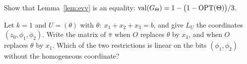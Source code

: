 \chapterquestions
\begin{question}\label{q:evvexact}
Show that Lemma~\ref{lem:evv} is an equality: $\operatorname{val}(G_\Theta)=1-\bigl(1-\operatorname{OPT}(\Theta)\bigr)/3$.
\end{question}

\begin{question}\label{q:pibar}
Let $k=1$ and $U=(\theta)$ with $\theta:\ x_1+x_2+x_3=b$, and give $L_U$ the coordinates $(z_0,\phi_1,\phi_2)$. Write the matrix of $\bar\pi$ when $O$ replaces $\theta$ by $x_3$, and when $O$ replaces $\theta$ by $x_1$. Which of the two restrictions is linear on the bits $(\phi_1,\phi_2)$ without the homogeneous coordinate?
\end{question}
